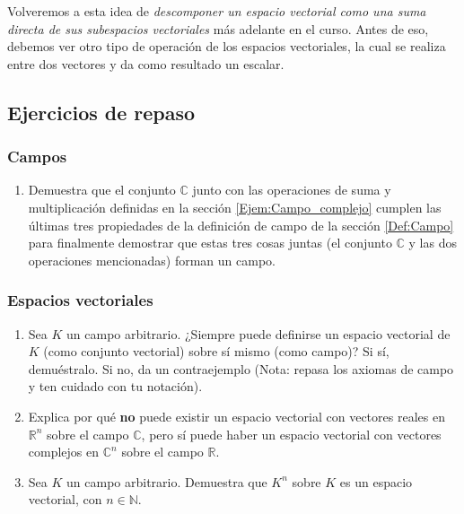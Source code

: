 \documentclass[12pt,dvipsnames]{article}
\begin{document}
Volveremos a esta idea de \emph{descomponer un espacio vectorial como una suma directa de sus subespacios vectoriales} más adelante en el curso. Antes de eso, debemos ver otro tipo de operación de los espacios vectoriales, la cual se realiza entre dos vectores y da como resultado un escalar.

\subsection{Ejercicios de repaso}

\subsubsection{Campos}

\begin{enumerate}
    \item Demuestra que el conjunto $\mathbb{C}$ junto con las operaciones de suma y multiplicación definidas en la sección \ref{Ejem:Campo_complejo} cumplen las últimas tres propiedades de la definición de campo de la sección \ref{Def:Campo} para finalmente demostrar que estas tres cosas juntas (el conjunto $\mathbb{C}$ y las dos operaciones mencionadas) forman un campo. 
\end{enumerate}

\subsubsection{Espacios vectoriales} \label{Ejer:Espacios_vectoriales}

\begin{enumerate}
    \item Sea $K$ un campo arbitrario. ¿Siempre puede definirse un espacio vectorial de $K$ (como conjunto vectorial) sobre sí mismo (como campo)? Si sí, demuéstralo. Si no, da un contraejemplo (Nota: repasa los axiomas de campo y ten cuidado con tu notación). 
    \item Explica por qué \textbf{no} puede existir un espacio vectorial con vectores reales en $\mathbb{R}^n$ sobre el campo $\mathbb{C}$, pero sí puede haber un espacio vectorial con vectores complejos en $\mathbb{C}^n$ sobre el campo $\mathbb{R}$. 
    \item Sea $K$ un campo arbitrario. Demuestra que $K^n$ sobre $K$ es un espacio vectorial, con $n\in\mathbb{N}$. 
\end{enumerate}
\end{document}
